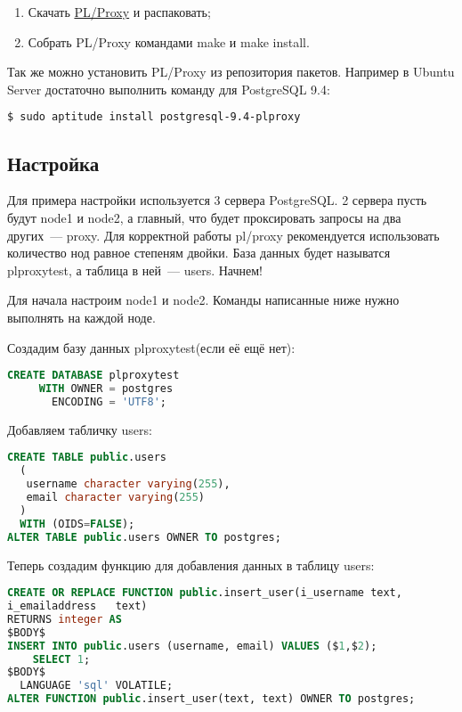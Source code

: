 \begin{enumerate}
  \item Скачать \href{http://pgfoundry.org/projects/plproxy}{PL/Proxy} и распаковать;
  \item Собрать PL/Proxy командами make и make install.
\end{enumerate}

Так же можно установить PL/Proxy из репозитория пакетов. Например в Ubuntu Server достаточно выполнить команду для PostgreSQL 9.4:

\begin{lstlisting}[language=Bash,label=lst:plproxy1,caption=Установка]
$ sudo aptitude install postgresql-9.4-plproxy
\end{lstlisting}

\subsection{Настройка}

Для примера настройки используется 3 сервера PostgreSQL. 2 сервера пусть будут node1 и node2, а главный, что будет проксировать запросы на два других~--- proxy. Для корректной работы pl/proxy рекомендуется использовать количество нод равное степеням двойки. База данных будет называтся plproxytest, а таблица в ней~--- users. Начнем!

Для начала настроим node1 и node2. Команды написанные ниже нужно выполнять на каждой ноде.

Создадим базу данных plproxytest(если её ещё нет):

\begin{lstlisting}[language=SQL,label=lst:plproxy2,caption=Настройка]
CREATE DATABASE plproxytest
     WITH OWNER = postgres
       ENCODING = 'UTF8';
\end{lstlisting}

Добавляем табличку users:

\begin{lstlisting}[language=SQL,label=lst:plproxy3,caption=Настройка]
CREATE TABLE public.users
  (
   username character varying(255),
   email character varying(255)
  )
  WITH (OIDS=FALSE);
ALTER TABLE public.users OWNER TO postgres;
\end{lstlisting}

Теперь создадим функцию для добавления данных в таблицу users:

\begin{lstlisting}[language=SQL,label=lst:plproxy4,caption=Настройка]
CREATE OR REPLACE FUNCTION public.insert_user(i_username text,
i_emailaddress   text)
RETURNS integer AS
$BODY$
INSERT INTO public.users (username, email) VALUES ($1,$2);
    SELECT 1;
$BODY$
  LANGUAGE 'sql' VOLATILE;
ALTER FUNCTION public.insert_user(text, text) OWNER TO postgres;
\end{lstlisting}

